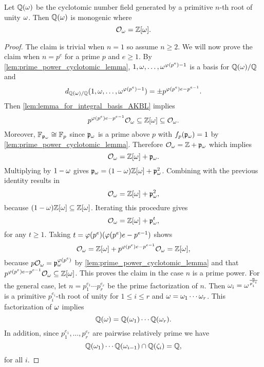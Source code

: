     \begin{proposition}
      Let $\mathbb{Q}(\omega)$ be the cyclotomic number field generated by a primitive $n$-th root of unity $\omega$. Then $\mathbb{Q}(\omega)$ is monogenic where
      \[
        \mathcal{O}_{\omega} = \mathbb{Z}[\omega].
      \]
    \end{proposition}
    \begin{proof}
      The claim is trivial when $n = 1$ so assume $n \ge 2$. We will now prove the claim when $n = p^{e}$ for a prime $p$ and $e \ge 1$. By \cref{lem:prime_power_cyclotomic_lemma}, $1,\omega,\ldots,\omega^{\varphi(p^{e})-1}$ is a basis for $\mathbb{Q}(\omega)/\mathbb{Q}$ and
      \[
        d_{\mathbb{Q}(\omega)/\mathbb{Q}}(1,\omega,\ldots,\omega^{\varphi(p^{e})-1}) = \pm p^{\varphi(p^{e})e-p^{e-1}}.
      \]
      Then \cref{lem:lemma_for_integral_basis_AKBL} implies
      \[
        p^{\varphi(p^{e})e-p^{e-1}}\mathcal{O}_{\omega} \subseteq \mathbb{Z}[\omega] \subseteq \mathcal{O}_{\omega}.
      \]
      Moreover, $\mathbb{F}_{\mathfrak{p}_{\omega}} \cong \mathbb{F}_{p}$ since $\mathfrak{p}_{\omega}$ is a prime above $p$ with $f_{p}(\mathfrak{p}_{\omega}) = 1$ by \cref{lem:prime_power_cyclotomic_lemma}. Therefore $\mathcal{O}_{\omega} = \mathbb{Z}+\mathfrak{p}_{\omega}$ which implies
      \[
        \mathcal{O}_{\omega} = \mathbb{Z}[\omega]+\mathfrak{p}_{\omega}.
      \]
      Multiplying by $1-\omega$ gives $\mathfrak{p}_{\omega} = (1-\omega)\mathbb{Z}[\omega]+\mathfrak{p}_{\omega}^{2}$. Combining with the previous identity results in
      \[
        \mathcal{O}_{\omega} = \mathbb{Z}[\omega]+\mathfrak{p}_{\omega}^{2},
      \]
      because $(1-\omega)\mathbb{Z}[\omega] \subseteq \mathbb{Z}[\omega]$. Iterating this procedure gives
      \[
        \mathcal{O}_{\omega} = \mathbb{Z}[\omega]+\mathfrak{p}_{\omega}^{t},
      \]
      for any $t \ge 1$. Taking $t = \varphi(p^{e})(\varphi(p^{e})e-p^{e-1})$ shows
      \[
        \mathcal{O}_{\omega} = \mathbb{Z}[\omega]+p^{\varphi(p^{e})e-p^{e-1}}\mathcal{O}_{\omega} = \mathbb{Z}[\omega],
      \]
      because $p\mathcal{O}_{\omega} = \mathfrak{p}_{\omega}^{\varphi(p^{e})}$ by \cref{lem:prime_power_cyclotomic_lemma} and that $p^{\varphi(p^{e})e-p^{e-1}}\mathcal{O}_{\omega} \subseteq \mathbb{Z}[\omega]$. This proves the claim in the case $n$ is a prime power. For the general case, let $n = p_{1}^{e_{1}} \cdots p_{r}^{e_{r}}$ be the prime factorization of $n$. Then $\omega_{i} = \omega^{\frac{n}{ p_{i}^{e_{i}}}}$ is a primitive $p_{i}^{e_{i}}$-th root of unity for $1 \le i \le r$ and $\omega = \omega_{1} \cdots \omega_{r}$. This factorization of $\omega$ implies
      \[
        \mathbb{Q}(\omega) = \mathbb{Q}(\omega_{1}) \cdots \mathbb{Q}(\omega_{r}).
      \]
      In addition, since $p_{1}^{e_{1}},\ldots,p_{r}^{e_{r}}$ are pairwise relatively prime we have
      \[
        \mathbb{Q}(\omega_{1}) \cdots \mathbb{Q}(\omega_{i-1}) \cap \mathbb{Q}(\zeta_{i}) = \mathbb{Q},
      \]
      for all $i$.
    \end{proof}